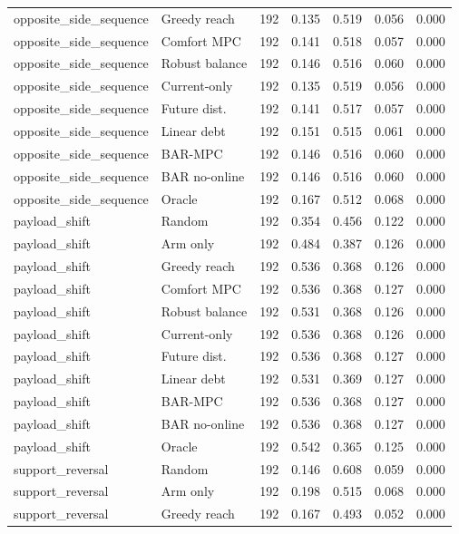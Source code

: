 \begin{longtable}{llrrrrr}
opposite\_side\_sequence & Greedy reach & 192 & 0.135 & 0.519 & 0.056 & 0.000 \\
opposite\_side\_sequence & Comfort MPC & 192 & 0.141 & 0.518 & 0.057 & 0.000 \\
opposite\_side\_sequence & Robust balance & 192 & 0.146 & 0.516 & 0.060 & 0.000 \\
opposite\_side\_sequence & Current-only & 192 & 0.135 & 0.519 & 0.056 & 0.000 \\
opposite\_side\_sequence & Future dist. & 192 & 0.141 & 0.517 & 0.057 & 0.000 \\
opposite\_side\_sequence & Linear debt & 192 & 0.151 & 0.515 & 0.061 & 0.000 \\
opposite\_side\_sequence & BAR-MPC & 192 & 0.146 & 0.516 & 0.060 & 0.000 \\
opposite\_side\_sequence & BAR no-online & 192 & 0.146 & 0.516 & 0.060 & 0.000 \\
opposite\_side\_sequence & Oracle & 192 & 0.167 & 0.512 & 0.068 & 0.000 \\
payload\_shift & Random & 192 & 0.354 & 0.456 & 0.122 & 0.000 \\
payload\_shift & Arm only & 192 & 0.484 & 0.387 & 0.126 & 0.000 \\
payload\_shift & Greedy reach & 192 & 0.536 & 0.368 & 0.126 & 0.000 \\
payload\_shift & Comfort MPC & 192 & 0.536 & 0.368 & 0.127 & 0.000 \\
payload\_shift & Robust balance & 192 & 0.531 & 0.368 & 0.126 & 0.000 \\
payload\_shift & Current-only & 192 & 0.536 & 0.368 & 0.126 & 0.000 \\
payload\_shift & Future dist. & 192 & 0.536 & 0.368 & 0.127 & 0.000 \\
payload\_shift & Linear debt & 192 & 0.531 & 0.369 & 0.127 & 0.000 \\
payload\_shift & BAR-MPC & 192 & 0.536 & 0.368 & 0.127 & 0.000 \\
payload\_shift & BAR no-online & 192 & 0.536 & 0.368 & 0.127 & 0.000 \\
payload\_shift & Oracle & 192 & 0.542 & 0.365 & 0.125 & 0.000 \\
support\_reversal & Random & 192 & 0.146 & 0.608 & 0.059 & 0.000 \\
support\_reversal & Arm only & 192 & 0.198 & 0.515 & 0.068 & 0.000 \\
support\_reversal & Greedy reach & 192 & 0.167 & 0.493 & 0.052 & 0.000 \\

\end{longtable}
